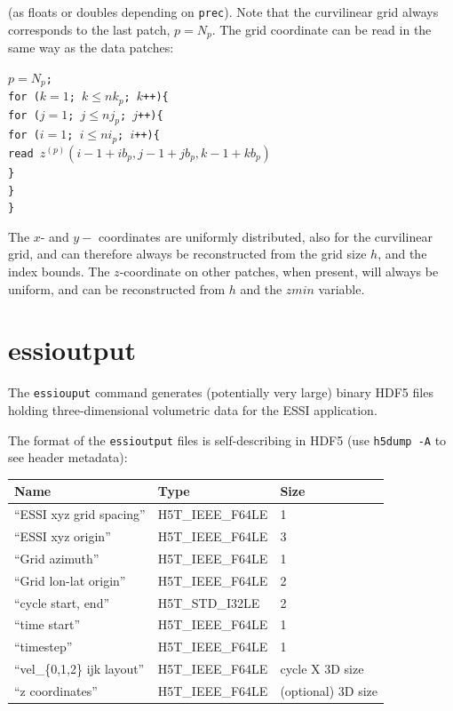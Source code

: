 \documentclass[11pt]{report}
\begin{document}
(as floats or doubles depending on {\tt prec}). Note that the curvilinear grid always
corresponds to the last patch, $p=N_p$. The grid coordinate can be read in the same way as
the data patches:
\begin{flushleft}
{\tt $p=N_p$;\\
for ($k=1$; $k\leq nk_p$; $k$++)\{\\
\hspace{5mm}for ($j=1$; $j\leq nj_p$; $j$++)\{\\
\hspace{10mm}for ($i=1$; $i\leq ni_p$; $i$++)\{\\
\hspace{15mm}read $z^{(p)}(i-1+ib_p, j-1+jb_p,k-1+kb_p)$\\
\hspace{10mm}\}\\
\hspace{5mm}\}\\
\}}
\end{flushleft}
The $x$- and $y-$ coordinates are uniformly distributed, also for the curvilinear grid, and can therefore always be
reconstructed from the grid size $h$, and the index bounds. The $z$-coordinate on other patches, when present, will
always be uniform, and can be reconstructed from $h$ and the $zmin$ variable.

\section{essioutput}\label{sec:essioutput-format}

The \verb+essiouput+ command generates (potentially very large) binary HDF5
  files holding three-dimensional volumetric data for the ESSI application.

The format of the \verb+essioutput+ files is self-describing in HDF5
  (use {\tt h5dump -A} to see header metadata):
\begin{center}
\begin{tabular}{lll}\hline
Name & Type & Size \\ \hline
  ``ESSI xyz grid spacing'' & H5T\_IEEE\_F64LE & 1 \\ \hline
  ``ESSI xyz origin'' & H5T\_IEEE\_F64LE & 3 \\ \hline
  ``Grid azimuth'' & H5T\_IEEE\_F64LE & 1 \\ \hline
  ``Grid lon-lat origin'' & H5T\_IEEE\_F64LE & 2 \\ \hline
  ``cycle start, end'' & H5T\_STD\_I32LE & 2 \\ \hline
  ``time start'' & H5T\_IEEE\_F64LE & 1 \\ \hline
  ``timestep'' & H5T\_IEEE\_F64LE & 1 \\ \hline
  ``vel\_\{0,1,2\} ijk layout'' & H5T\_IEEE\_F64LE & cycle X 3D size \\ \hline
  ``z coordinates'' & H5T\_IEEE\_F64LE & (optional) 3D size \\ \hline
\end{tabular}
\end{center}
\end{document}
